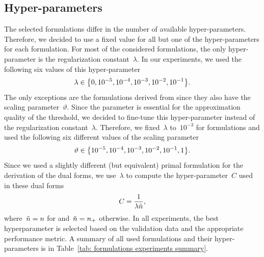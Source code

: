 \pagebreak

\subsection{Hyper-parameters}

The selected formulations differ in the number of available hyper-parameters. Therefore, we decided to use a fixed value for all but one of the hyper-parameters for each formulation. For most of the considered formulations, the only hyper-parameter is the regularization constant~$\lambda$. In our experiments, we used the following six values of this hyper-parameter
\begin{equation*}
  \lambda \in \Brac[c]{0, 10^{-5}, 10^{-4}, 10^{-3}, 10^{-2}, 10^{-1}}.
\end{equation*}
The only exceptions are the formulations derived from \PatMatNP since they also have the scaling parameter~$\vartheta.$ Since the parameter is essential for the approximation quality of the threshold, we decided to fine-tune this hyper-parameter instead of the regularization constant~$\lambda$. Therefore, we fixed~$\lambda$ to~$10^{-3}$ for \PatMatNP formulations and used the following six different values of the scaling parameter
\begin{equation*}
  \vartheta \in \Brac[c]{10^{-5}, 10^{-4}, 10^{-3}, 10^{-2}, 10^{-1}, 1}.
\end{equation*}
Since we used a slightly different (but equivalent) primal formulation for the derivation of the dual forms, we use~$\lambda$ to compute the hyper-parameter~$C$ used in these dual forms
\begin{equation*}
  C = \frac{1}{\lambda \tilde{n}},
\end{equation*}
where~$\tilde{n} = n$ for \SVM and~$\tilde{n} = n_{+}$ otherwise. In all experiments, the best hyperparameter is selected based on the validation data and the appropriate performance metric. A summary of all used formulations and their hyper-parameters is in Table~\ref{tab: formulations experiments summary}.

